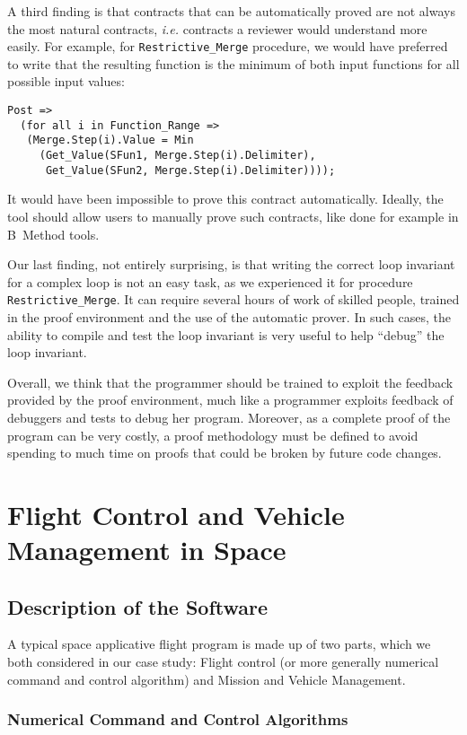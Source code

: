 \documentclass[10pt,a4paper,twocolumn]{article}
\newcommand{\ie}{\textit{i.e.}\xspace}
\newcommand{\SPARK}[1]{\lstinline[language=Ada,basicstyle={\footnotesize
      \sffamily},framesep=0pt]$#1$}
\begin{document}
A third finding is that contracts that can be automatically proved are
not always the most natural contracts, \ie contracts a reviewer would
understand more easily. For example, for \SPARK{Restrictive_Merge}
procedure, we would have preferred to write that the resulting function
is the minimum of both input functions for all possible input
values:
\begin{lstlisting}
Post =>
  (for all i in Function_Range =>
   (Merge.Step(i).Value = Min
     (Get_Value(SFun1, Merge.Step(i).Delimiter),
      Get_Value(SFun2, Merge.Step(i).Delimiter))));
\end{lstlisting}
It would have been impossible to prove this contract automatically. Ideally,
the tool should allow users to manually prove such contracts, like done for
example in B~Method tools.

Our last finding, not entirely surprising, is that writing the correct
loop invariant for a complex loop is not an easy task, as we experienced
it for procedure \SPARK{Restrictive_Merge}. It can require several
hours of work of skilled people, trained in the proof environment and
the use of the automatic prover. In such cases, the ability to
compile and test the loop invariant is very useful to help ``debug''
the loop invariant.

Overall, we think that the programmer should be trained to exploit the
feedback provided by the proof environment, much like a programmer
exploits feedback of debuggers and tests to debug her program.
Moreover, as a complete proof of the program can be very costly, a proof
methodology must be defined to avoid spending to much time on proofs
that could be broken by future code changes.

\section{Flight Control and Vehicle Management in Space}

\subsection{Description of the Software}

A typical space applicative flight program is made up of two parts, which we
both considered in our case study:
Flight control (or more generally numerical command and control algorithm) and
Mission and Vehicle Management.

\subsubsection{Numerical Command and Control Algorithms}
\end{document}
